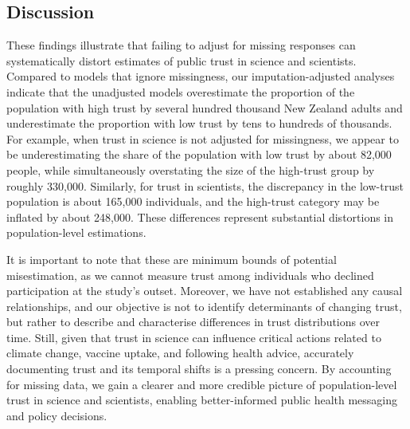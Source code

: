 \documentclass[
  single column]{article}
\begin{document}
\subsection{Discussion}\label{discussion}

These findings illustrate that failing to adjust for missing responses
can systematically distort estimates of public trust in science and
scientists. Compared to models that ignore missingness, our
imputation-adjusted analyses indicate that the unadjusted models
overestimate the proportion of the population with high trust by several
hundred thousand New Zealand adults and underestimate the proportion
with low trust by tens to hundreds of thousands. For example, when trust
in science is not adjusted for missingness, we appear to be
underestimating the share of the population with low trust by about
82,000 people, while simultaneously overstating the size of the
high-trust group by roughly 330,000. Similarly, for trust in scientists,
the discrepancy in the low-trust population is about 165,000
individuals, and the high-trust category may be inflated by about
248,000. These differences represent substantial distortions in
population-level estimations.

It is important to note that these are minimum bounds of potential
misestimation, as we cannot measure trust among individuals who declined
participation at the study's outset. Moreover, we have not established
any causal relationships, and our objective is not to identify
determinants of changing trust, but rather to describe and characterise
differences in trust distributions over time. Still, given that trust in
science can influence critical actions related to climate change,
vaccine uptake, and following health advice, accurately documenting
trust and its temporal shifts is a pressing concern. By accounting for
missing data, we gain a clearer and more credible picture of
population-level trust in science and scientists, enabling
better-informed public health messaging and policy decisions.
\end{document}
